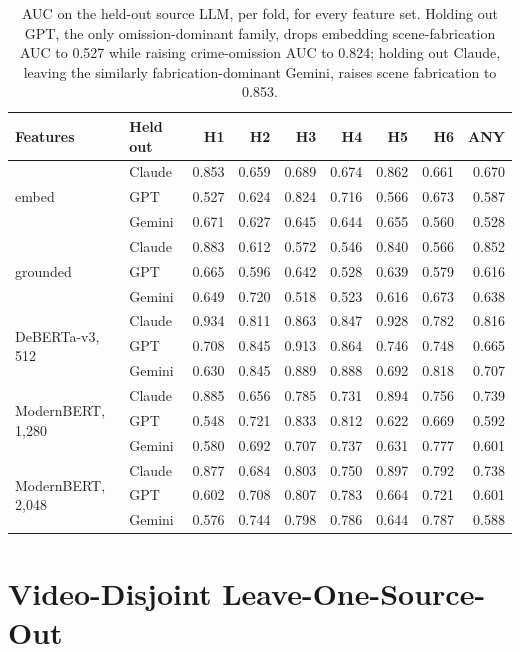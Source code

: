 \begin{table}[H]
\caption{AUC on the held-out source LLM, per fold, for every feature set.
Holding out GPT, the only omission-dominant family, drops embedding
scene-fabrication AUC to 0.527 while raising crime-omission AUC to 0.824;
holding out Claude, leaving the similarly fabrication-dominant Gemini, raises
scene fabrication to 0.853.}
\label{tab:perfold}
\centering\footnotesize
\begin{tabular}{llrrrrrrr}
\toprule
Features & Held out & H1 & H2 & H3 & H4 & H5 & H6 & ANY \\
\midrule
\multirow{3}{*}{embed}
 & Claude & 0.853 & 0.659 & 0.689 & 0.674 & 0.862 & 0.661 & 0.670 \\
 & GPT    & 0.527 & 0.624 & 0.824 & 0.716 & 0.566 & 0.673 & 0.587 \\
 & Gemini & 0.671 & 0.627 & 0.645 & 0.644 & 0.655 & 0.560 & 0.528 \\
\midrule
\multirow{3}{*}{grounded}
 & Claude & 0.883 & 0.612 & 0.572 & 0.546 & 0.840 & 0.566 & 0.852 \\
 & GPT    & 0.665 & 0.596 & 0.642 & 0.528 & 0.639 & 0.579 & 0.616 \\
 & Gemini & 0.649 & 0.720 & 0.518 & 0.523 & 0.616 & 0.673 & 0.638 \\
\midrule
\multirow{3}{*}{DeBERTa-v3, 512}
 & Claude & 0.934 & 0.811 & 0.863 & 0.847 & 0.928 & 0.782 & 0.816 \\
 & GPT    & 0.708 & 0.845 & 0.913 & 0.864 & 0.746 & 0.748 & 0.665 \\
 & Gemini & 0.630 & 0.845 & 0.889 & 0.888 & 0.692 & 0.818 & 0.707 \\
\midrule
\multirow{3}{*}{ModernBERT, 1{,}280}
 & Claude & 0.885 & 0.656 & 0.785 & 0.731 & 0.894 & 0.756 & 0.739 \\
 & GPT    & 0.548 & 0.721 & 0.833 & 0.812 & 0.622 & 0.669 & 0.592 \\
 & Gemini & 0.580 & 0.692 & 0.707 & 0.737 & 0.631 & 0.777 & 0.601 \\
\midrule
\multirow{3}{*}{ModernBERT, 2{,}048}
 & Claude & 0.877 & 0.684 & 0.803 & 0.750 & 0.897 & 0.792 & 0.738 \\
 & GPT    & 0.602 & 0.708 & 0.807 & 0.783 & 0.664 & 0.721 & 0.601 \\
 & Gemini & 0.576 & 0.744 & 0.798 & 0.786 & 0.644 & 0.787 & 0.588 \\
\bottomrule
\end{tabular}
\end{table}

\section{Video-Disjoint Leave-One-Source-Out}
\label{app:strict}

